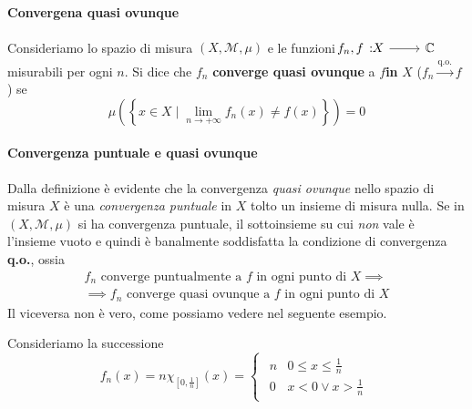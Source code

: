 \paragraph{Convergena quasi ovunque}
\begin{define}
	Consideriamo lo spazio di misura $\left(X,\mathcal{M},\mu\right)$ e le funzioni $\funz{f_n,f}{X}{\complexset}$ misurabili per ogni $n$. Si dice che
	$f_n$ \textbf{converge quasi ovunque} a $f$\textbf{in} $X$ ($f_n\overset{\text{q.o.}}{\to} f$) se
	\begin{equation}
		\mu\left(\left\{x\in X\mid \lim_{n\to+\infty}f_n\left(x\right)\neq f\left(x\right)\right\}\right)=0
	\end{equation}
\end{define}
\paragraph{Convergenza puntuale e quasi ovunque}
Dalla definizione è evidente che la convergenza \textit{quasi ovunque} nello spazio di misura $X$ è una \textit{convergenza puntuale} in $X$ tolto un insieme di misura nulla. Se in $\left(X,\mathcal{M},\mu\right)$ si ha convergenza puntuale, il sottoinsieme su cui \textit{non} vale è l'insieme vuoto e quindi è banalmente soddisfatta la condizione di convergenza \textbf{q.o.}, ossia
\begin{multline}
	f_n\text{ converge puntualmente a }f\text{ in ogni punto di }X\implies\\
	\implies f_n\text{ converge quasi ovunque a }f\text{ in ogni punto di }X
\end{multline}
Il viceversa non è vero, come possiamo vedere nel seguente esempio.
\begin{example}
	Consideriamo la successione
	\begin{equation*}
		f_n\left(x\right)=n\chi_{\left[0,\frac{1}{n}\right]}\left(x\right)=
		\begin{cases}
			\begin{array}{ll}
				n&0\leq x\leq\frac{1}{n}\\
				0&x< 0\vee x>\frac{1}{n}
			\end{array}
		\end{cases}
	\end{equation*}
\end{example}
